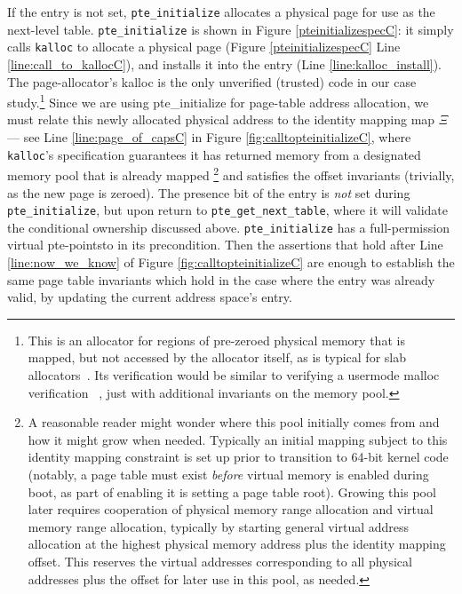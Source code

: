 If the entry is not set, \lstinline|pte_initialize|  
allocates a physical page for use as the next-level table.
\lstinline|pte_initialize| is shown in Figure \ref{pteinitializespecC}: it simply calls
\lstinline|kalloc| to allocate a physical page (Figure \ref{pteinitializespecC} Line \ref{line:call_to_kallocC}),
and installs it into the entry (Line \ref{line:kalloc_install}).
The page-allocator's \textsf{kalloc}
is the only unverified (trusted) code in our case study.\footnote{
  This is an allocator for regions of pre-zeroed physical memory that is mapped, but not accessed by the allocator itself,
  as is typical for slab allocators~\cite{bonwick1994slab}.
  Its verification would be similar to verifying a usermode \textsf{malloc} verification ~\cite{Chlipala2013Bedrock,wickerson2010explicit},
  just with additional invariants on the memory pool.
} 
Since we are using \textsf{pte\_initialize} for page-table address allocation, we must relate this newly
allocated physical address to the identity mapping map $\Xi$ --- 
see Line \ref{line:page_of_capsC} in Figure \ref{fig:calltopteinitializeC}, where
\texttt{kalloc}'s specification guarantees it has returned memory from a designated memory
pool that is already mapped
\footnote{A reasonable reader might wonder where this pool
initially comes from and how it might grow when needed. Typically an initial mapping subject to this identity mapping
constraint is set up prior to transition to 64-bit kernel code (notably,
a page table must exist \emph{before} virtual memory is enabled during boot, as part of enabling it is setting
a page table root).
Growing this pool later requires cooperation of physical memory range allocation and virtual memory range allocation,
typically by starting general virtual address allocation at the highest physical memory address plus the identity mapping offset.
This reserves the virtual addresses corresponding to all physical addresses plus the offset for later use in this pool,
as needed.
} 
and satisfies the offset invariants (trivially, as the new page is zeroed).
The presence bit of the entry is \emph{not} set during \lstinline|pte_initialize|, but upon
return to \lstinline|pte_get_next_table|, where it will validate the conditional ownership discussed above.
\lstinline|pte_initialize| has a full-permission virtual pte-pointsto in its precondition.
Then the assertions that hold after Line \ref{line:now_we_know} of Figure \ref{fig:calltopteinitializeC}
are enough to establish the same page table invariants which hold in the case where the entry was already valid,
by updating the current address space's entry.

